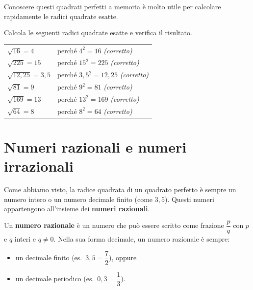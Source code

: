 Conoscere questi quadrati perfetti a memoria è molto utile per calcolare
rapidamente le radici quadrate esatte.

\begin{esempio}
    Calcola le seguenti radici quadrate esatte e verifica il risultato.

    \medskip

    \begin{tabular}{ll}
        \(\sqrt{16} = 4\)          & perché \(4^2 = 16\) \quad \textit{(corretto)}          \\[4pt]
        \(\sqrt{225} = 15\)        & perché \(15^2 = 225\) \quad \textit{(corretto)}        \\[4pt]
        \(\sqrt{12{,}25} = 3{,}5\) & perché \(3{,}5^2 = 12{,}25\) \quad \textit{(corretto)} \\[4pt]
        \(\sqrt{81} = 9\)          & perché \(9^2 = 81\) \quad \textit{(corretto)}          \\[4pt]
        \(\sqrt{169} = 13\)        & perché \(13^2 = 169\) \quad \textit{(corretto)}        \\[4pt]
        \(\sqrt{64} = 8\)          & perché \(8^2 = 64\) \quad \textit{(corretto)}          \\
    \end{tabular}
\end{esempio}

\section{Numeri razionali e numeri irrazionali}

Come abbiamo visto, la radice quadrata di un quadrato perfetto è sempre
un numero intero o un numero decimale finito (come \(3{,}5\)).
Questi numeri appartengono all'insieme dei \textbf{numeri razionali}.

\begin{definizione}
    Un \textbf{numero razionale} è un numero che può essere scritto come
    frazione \(\dfrac{p}{q}\) con \(p\) e \(q\) interi e \(q \neq 0\).
    Nella sua forma decimale, un numero razionale è sempre:
    \begin{itemize}
        \item un decimale finito (es.\ \(3{,}5 = \dfrac{7}{2}\)), oppure
        \item un decimale periodico (es.\ \(0{,}\overline{3} = \dfrac{1}{3}\)).
    \end{itemize}
\end{definizione}

